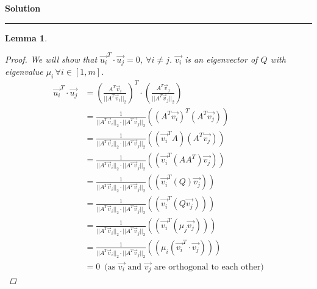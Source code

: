 \documentclass[a4paper,12pt]{article}
\newenvironment{solution}[2][]{%
    \begin{mdframed}[linecolor=blue!70!black, linewidth=2pt, roundcorner=10pt, backgroundcolor=yellow!10!white, skipabove=12pt, skipbelow=12pt]%
        \textbf{\large #2}
        \par\noindent\rule{\textwidth}{0.4pt}
}{
    \end{mdframed}
}
\newtheorem{lemma}{Lemma}
\begin{document}
\begin{solution}{Solution}
\begin{lemma}
\begin{proof}
            We will show that $\vec{u_{i}}^{T} \cdot \vec{u_{j}} = 0$, $\forall i \neq j$. $\vec{v_{i}}$ is an eigenvector
            of $Q$ with eigenvalue $\mu_{i} \, \forall i \in [1,m]$.
            \begin{align*}
              \vec{u_{i}}^{T} \cdot \vec{u_{j}} &= {\left(\frac{A^{T} \vec{v}_{i}}{\lvert\lvert A^{T} \vec{v}_{i} \rvert\rvert_{2}}\right)}^{T}
              \cdot \left(\frac{A^{T} \vec{v}_{j}}{\lvert\lvert A^{T} \vec{v}_{j} \rvert\rvert_{2}}\right) \\
              &= \frac{1}{\lvert\lvert A^{T} \vec{v}_{i} \rvert\rvert_{2}\cdot  \lvert\lvert A^{T} \vec{v}_{j} \rvert\rvert_{2}} 
              \left( {(A^{T}\vec{v_{i}})}^{T} (A^{T}\vec{v_{j}})\right) \\
              &= \frac{1}{\lvert\lvert A^{T} \vec{v}_{i} \rvert\rvert_{2}\cdot  \lvert\lvert A^{T} \vec{v}_{j} \rvert\rvert_{2}} 
              \left( (\vec{v_{i}}^{T} A) (A^{T}\vec{v_{j}})\right) \\              
              &= \frac{1}{\lvert\lvert A^{T} \vec{v}_{i} \rvert\rvert_{2}\cdot  \lvert\lvert A^{T} \vec{v}_{j} \rvert\rvert_{2}} 
              \left( (\vec{v_{i}}^{T} (AA^{T}) \vec{v_{j}})\right) \\
              &= \frac{1}{\lvert\lvert A^{T} \vec{v}_{i} \rvert\rvert_{2}\cdot  \lvert\lvert A^{T} \vec{v}_{j} \rvert\rvert_{2}} 
              \left( (\vec{v_{i}}^{T} (Q) \vec{v_{j}})\right) \\
              &= \frac{1}{\lvert\lvert A^{T} \vec{v}_{i} \rvert\rvert_{2}\cdot  \lvert\lvert A^{T} \vec{v}_{j} \rvert\rvert_{2}} 
              \left( (\vec{v_{i}}^{T} (Q \vec{v_{j}}))\right) \\
              &= \frac{1}{\lvert\lvert A^{T} \vec{v}_{i} \rvert\rvert_{2}\cdot  \lvert\lvert A^{T} \vec{v}_{j} \rvert\rvert_{2}} 
              \left( (\vec{v_{i}}^{T} (\mu_{j} \vec{v_{j}}) )\right) \\
              &= \frac{1}{\lvert\lvert A^{T} \vec{v}_{i} \rvert\rvert_{2}\cdot  \lvert\lvert A^{T} \vec{v}_{j} \rvert\rvert_{2}} 
              \left( (\mu_{i}(\vec{v_{i}}^{T} \cdot \vec{v_{j}}))\right) \\
              &= 0 \,\text{ (as $\vec{v_{i}}$ and $\vec{v_{j}}$ are orthogonal to each other)}
            \end{align*}


\end{proof}
\end{lemma}
\end{solution}
\end{document}
